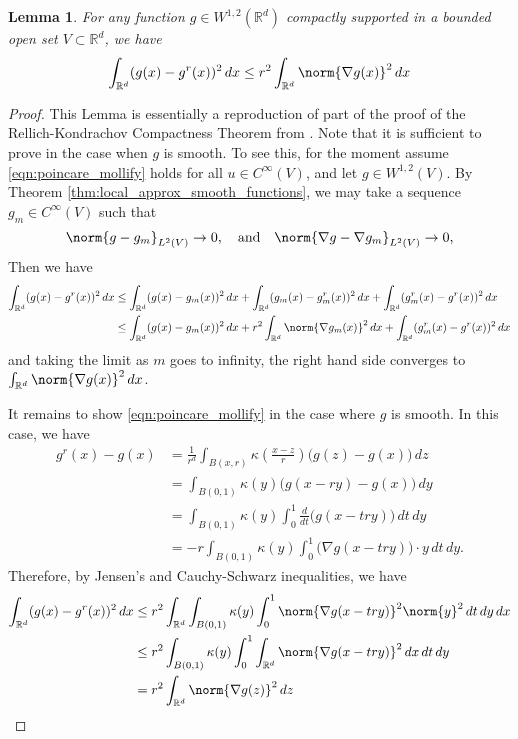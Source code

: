 \documentclass{article}
\newcommand{\Reals}{\mathbb{R}}
\newcommand{\1}{\mathbf{1}}
\newcommand{\Rd}{\Reals^d}
\theoremstyle{alden}
\theoremstyle{aldenthm}
\newtheorem{lemma}{Lemma}
\theoremstyle{definition}
\theoremstyle{remark}
\begin{document}
\begin{lemma}
	\label{lem:poincare_mollify}
	For any function $g \in W^{1,2}(\Rd)$ compactly supported in a bounded open set $V \subset \Rd$, we have
	\begin{equation}
	\label{eqn:poincare_mollify}
	\int_{\Rd} (g(x) - g^r(x))^2 \,dx \leq r^2 \int_{\Rd} \norm{\nabla g(x)}^2 \,dx
	\end{equation}
\end{lemma}
\begin{proof}
	This Lemma is essentially a reproduction of part of the proof of the Rellich-Kondrachov Compactness Theorem from \citep{evans10}. Note that it is sufficient to prove in the case when $g$ is smooth. To see this, for the moment assume \eqref{eqn:poincare_mollify} holds for all $u \in C^{\infty}(V)$, and let $g \in W^{1,2}(V)$. By Theorem \ref{thm:local_approx_smooth_functions}, we may take a sequence $g_m \in C^{\infty}(V)$ such that
	\begin{equation*}
	\norm{g - g_m}_{L^2(V)} \to 0, \quad \textrm{and} \quad \norm{\nabla g - \nabla g_m}_{L^2(V)} \to 0,
	\end{equation*}
	Then we have
	\begin{align*}
	\int_{\Rd} (g(x) - g^r(x))^2 \,dx & \leq \int_{\Rd} (g(x) - g_m(x))^2 \,dx + \int_{\Rd}(g_m(x) - g_m^r(x))^2 \,dx + \int_{\Rd}(g_m^r(x) - g^r(x))^2 \,dx \\
	& \leq \int_{\Rd} (g(x) - g_m(x))^2 \,dx + r^2 \int_{\Rd} \norm{\nabla g_m(x)}^2 \,dx + \int_{\Rd}(g_m^r(x) - g^r(x))^2 \,dx
	\end{align*}
	and taking the limit as $m$ goes to infinity, the right hand side converges to $\int_{\Rd} \norm{\nabla g(x)}^2 \,dx$. 
	
	It remains to show \eqref{eqn:poincare_mollify} in the case where $g$ is smooth. In this case, we have
	\begin{align*}
	g^{r}(x) -  g(x) & = \frac{1}{r^d} \int_{B(x,r)} \kappa \left(\frac{x - z}{r}\right)\bigl(g(z) - g(x)\bigr) \,dz \\
	& = \int_{B(0,1)} \kappa(y) \bigl(g(x - ry) - g(x)\bigr) \,dy \\
	& = \int_{B(0,1)} \kappa(y) \int_{0}^{1} \frac{d}{dt} \bigl(g(x - try) \bigr) \,dt \,dy \\
	& = -r \int_{B(0,1)} \kappa(y) \int_{0}^{1} \bigl(\nabla g (x - try) \bigr) \cdot y \,dt \,dy.
	\end{align*} 
	Therefore, by Jensen's and Cauchy-Schwarz inequalities, we have
	\begin{align*}
	\int_{\Rd} (g(x) - g^r(x))^2 \,dx & \leq r^2 \int_{\Rd} \int_{B(0,1)} \kappa(y) \int_{0}^{1} \norm{\nabla g (x - try)}^2 \norm{y}^2 \,dt \,dy \,dx \\
	& \leq r^2 \int_{B(0,1)} \kappa(y) \int_{0}^{1} \int_{\Rd} \norm{\nabla g (x - try)}^2 \,dx \,dt \,dy \\
	& = r^2 \int_{\Rd} \norm{\nabla g(z)}^2 \,dz
	\end{align*}
\end{proof}
\end{document}

